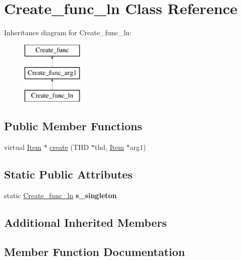 \hypertarget{classCreate__func__ln}{}\section{Create\+\_\+func\+\_\+ln Class Reference}
\label{classCreate__func__ln}
Inheritance diagram for Create\+\_\+func\+\_\+ln\+:\begin{figure}[H]
\begin{center}
\leavevmode
\includegraphics[height=3.000000cm]{classCreate__func__ln}
\end{center}
\end{figure}
\subsection*{Public Member Functions}
\begin{DoxyCompactItemize}
\item 
virtual \mbox{\hyperlink{classItem}{Item}} $\ast$ \mbox{\hyperlink{classCreate__func__ln_aec536508a3d92bd12a5e13fd8b235dba}{create}} (T\+HD $\ast$thd, \mbox{\hyperlink{classItem}{Item}} $\ast$arg1)
\end{DoxyCompactItemize}
\subsection*{Static Public Attributes}
\begin{DoxyCompactItemize}
\item 
\mbox{\label{classCreate__func__ln_a145ae76291eaa50196ddf723aac8be4d}} 
static \mbox{\hyperlink{classCreate__func__ln}{Create\+\_\+func\+\_\+ln}} {\bfseries s\+\_\+singleton}
\end{DoxyCompactItemize}
\subsection*{Additional Inherited Members}


\subsection{Member Function Documentation}
\mbox{\label{classCreate__func__ln_aec536508a3d92bd12a5e13fd8b235dba}} 
